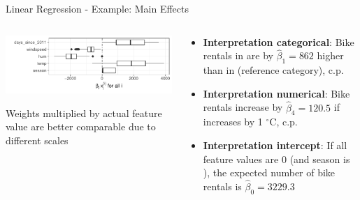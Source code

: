 \documentclass[11pt,compress,t,notes=noshow, aspectratio=169, xcolor=table]{beamer}
\begin{document}
\begin{frame}{Linear Regression - Example: Main Effects}
\begin{columns}[T, totalwidth=\linewidth]
\begin{column}{0.46\textwidth}

\includegraphics[width = \textwidth]{figure/plot_lin_effect.pdf}
  \begin{center}
    Weights multiplied by actual feature value are better comparable due to different scales
  \end{center}
%
\end{column}\hfill
\begin{column}{0.54\textwidth}  %

\begin{itemize}
    \item \textbf{Interpretation categorical}: Bike rentals in  are by $\hat\beta_1 = 862$ higher than in  (reference category), c.p.
    \item \textbf{Interpretation numerical}: Bike rentals increase by $\hat\beta_4 = 120.5$ if  increases by 1 $^{\circ}$C, c.p.
    \item \textbf{Interpretation intercept}:
    If all feature values are 0 (and season is ), the expected number of bike rentals is $\hat\beta_0 = 3229.3$
\end{itemize}
\end{column}
\end{columns}
\end{frame}
\end{document}
